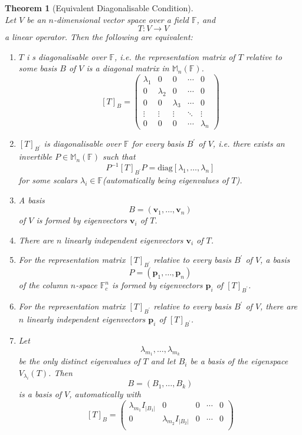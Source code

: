 \documentclass[12pt]{article}
\newtheorem{theorem}{Theorem}[section]
\theoremstyle{definition}
\begin{document}
\begin{theorem}[Equivalent Diagonalisable Condition]
\hfill\\\normalfont Let $V$ be an $n$-dimensional vector space over a field $\mathbb{F}$, and
\[
T:V\to V
\] 
a linear operator. Then the following are equivalent:
\begin{enumerate}
\item $T$ i s diagonalisable over $\mathbb{F}$, i.e. the representation matrix of $T$ relative to some basis $B$ of $V$ is a diagonal matrix in $\mathbb{M}_n(\mathbb{F})$.
\[
[T]_B=\begin{pmatrix}
\lambda_1&0&0&\cdots&0\\
0&\lambda_2&0&\cdots&0\\
0&0&\lambda_3&\cdots&0\\
\vdots&\vdots&\vdots&\ddots&\vdots\\
0&0&0&\cdots&\lambda_n
\end{pmatrix}
\]
\item $[T]_{B^\prime}$ is diagonalisable over $\mathbb{F}$ for every basis $B^\prime$ of $V$, i.e. there exists an invertible $P\in\mathbb{M}_n(\mathbb{F})$ such that
\[
P^{-1}[T]_{B^\prime}P=\text{diag}[\lambda_1,\ldots,\lambda_n]
\]
for some scalars $\lambda_i\in\mathbb{F}$(automatically being eigenvalues of $T$).
\item A basis
\[
B=(\mathbf{v}_1,\ldots,\mathbf{v}_n)
\]
of $V$ is formed by eigenvectors $\mathbf{v}_i$ of $T$.
\item There are $n$ linearly independent eigenvectors $\mathbf{v}_i$ of $T$.
\item For the representation matrix $[T]_{B^\prime}$ relative to every basis $B^\prime$ of $V$, a basis
\[
P=(\mathbf{p}_1,\ldots,\mathbf{p}_n)
\]
of the column $n$-space $\mathbb{F}_c^n$ is formed by eigenvectors $\mathbf{p}_i$ of $[T]_{B^\prime}$.
\item For the representation matrix $[T]_{B^\prime}$ relative to every basis $B^\prime$ of $V$, there are $n$ linearly independent eigenvectors $\mathbf{p}_i$ of $[T]_{B^\prime}$.
\item Let
\[
\lambda_{m_1},\ldots,\lambda_{m_k}
\]
be the only distinct eigenvalues of $T$ and let $B_i$ be a basis of the eigenspace $V_{\lambda_i}(T)$. Then
\[
B=(B_1,\ldots, B_k)
\]
is a basis of $V$, automatically with 
\[
[T]_B =\begin{pmatrix}
\lambda_{m_1}I_{|B_1|}&0&0&\cdots&0\\
0&\lambda_{m_2}I_{|B_2|}&0&\cdots&0\\

\end{pmatrix}\]
\end{enumerate}
\end{theorem}
\end{document}
